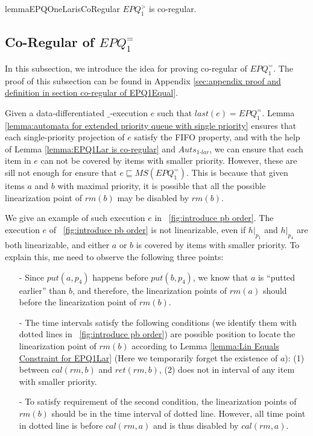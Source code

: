\begin{restatable}{lemma}{EPQOneLarisCoRegular}
\label{lemma:EPQ1Lar is co-regular}
$\textit{EPQ}_1^{>}$ is co-regular.
\end{restatable}




\subsection{Co-Regular of $\textit{EPQ}_1^{=}$}
\label{subsec:co-regular of EPQ1Equal}

In this subsection, we introduce the idea for proving co-regular of $\textit{EPQ}_1^{=}$. The proof of this subsection can be found in Appendix \ref{sec:appendix proof and definition in section co-regular of EPQ1Equal}.

Given a data-differentiated $\_$-execution $e$ such that $\textit{last}(e) = \textit{EPQ}_1^{=}$. Lemma \ref{lemma:automata for extended priority queue with single priority} ensures that each single-priority projection of $e$ satisfy the FIFO property, and with the help of Lemma \ref{lemma:EPQ1Lar is co-regular} and $\textit{Auts}_{\textit{1-lar}}$, we can ensure that each item in $e$ can not be covered by items with smaller priority. However, these are sill not enough for ensure that $e \sqsubseteq \textit{MS}(\textit{EPQ}_1^{=})$. This is because that given items $a$ and $b$ with maximal priority, it is possible that all the possible linearization point of $\textit{rm}(b)$ may be disabled by $\textit{rm}(b)$.

We give an example of such execution $e$ in \figurename~\ref{fig:introduce pb order}. The execution $e$ of \figurename~\ref{fig:introduce pb order} is not linearizable, even if $h \vert_{p_1}$ and $h \vert_{p_4}$ are both linearizable, and either $a$ or $b$ is covered by items with smaller priority. To explain this, me need to observe the following three points:

\begin{itemize}
\setlength{\itemsep}{0.5pt}
\item[-] Since $\textit{put}(a,p_4)$ happens before $\textit{put}(b,p_4)$, we know that $a$ is ``putted earlier'' than $b$, and therefore, the linearization points of $\textit{rm}(a)$ should before the linearization point of $\textit{rm}(b)$.

\item[-] The time intervals satisfy the following conditions (we identify them with dotted lines in \figurename~\ref{fig:introduce pb order}) are possible position to locate the linearization point of $\textit{rm}(b)$ according to Lemma \ref{lemma:Lin Equals Constraint for EPQ1Lar} (Here we temporarily forget the existence of $a$): (1) between $\textit{cal}(\textit{rm},b)$ and $\textit{ret}(\textit{rm},b)$, (2) does not in interval of any item with smaller priority.

\item[-] To satisfy requirement of the second condition, the linearization points of $\textit{rm}(b)$ should be in the time interval of dotted line. However, all time point in dotted line is before $\textit{cal}(\textit{rm},a)$ and is thus disabled by $\textit{cal}(\textit{rm},a)$.
\end{itemize}

